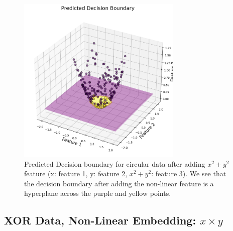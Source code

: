 \begin{solve}
\begin{figure}[H]
    \includegraphics[width=0.7\textwidth]{plots/7_circle_db.png}
    \caption{Predicted Decision boundary for circular data after adding $x^2 + y^2$ feature (x: feature 1, y: feature 2, $x^2 + y^2$: feature 3). We see that the decision boundary after adding the non-linear feature is a hyperplane across the purple and yellow points.}
\end{figure}

\end{solve}


\subsection{XOR Data, Non-Linear Embedding: $x\times y$}

